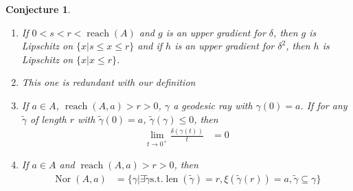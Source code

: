 \documentclass{article}
\theoremstyle{plain}
\newtheorem{conj}[thm]{Conjecture}
\theoremstyle{definition}
\renewcommand{\(}{\left(}
\renewcommand{\)}{\right)}
\DeclareMathOperator*{\reach}{reach}
\DeclareMathOperator*{\Nor}{Nor}
\DeclareMathOperator*{\length}{len}
\begin{document}
\begin{conj}
\begin{enumerate}
\begin{itemize}
    \item $\reach(A,\xi(y)) \geq q$
    \end{itemize}
    then
    \begin{align*}
      d(\xi(x),\xi(y)) &\leq \frac{q}{q-r}d(x,y)
    \end{align*}
  \item If $0 < s < r < \reach(A)$ and $g$ is an upper gradient for $\delta$, then $g$ is Lipschitz on $\{x \vert s \leq x \leq r\}$ and if $h$ is an upper gradient for $\delta^2$, then $h$ is Lipschitz on $\{x \vert x \leq r\}$.
  \item This one is redundant with our definition %
  \item If $a \in A$, $\reach(A,a) > r > 0$, $\gamma$ a geodesic ray with $\gamma(0) = a$. If for any $\tilde \gamma$ of length $r$ with $\tilde \gamma(0) = a$, $\tilde \gamma (\gamma) \leq 0$, then
    \begin{align*}
      \lim_{t \rightarrow 0^{+}} \frac{\delta(\gamma(t))}{t} &= 0
    \end{align*}
  \item If $a \in A$ and $\reach(A,a) > r > 0$, then
    \begin{align*}
      \Nor(A,a) &= \{ \gamma \vert \exists \tilde \gamma \text{s.t.}  \length(\tilde \gamma) = r, \xi(\tilde \gamma(r)) = a, \tilde \gamma \subseteq \gamma \}
    \end{align*}
  \end{enumerate}

\end{conj}
\end{document}
